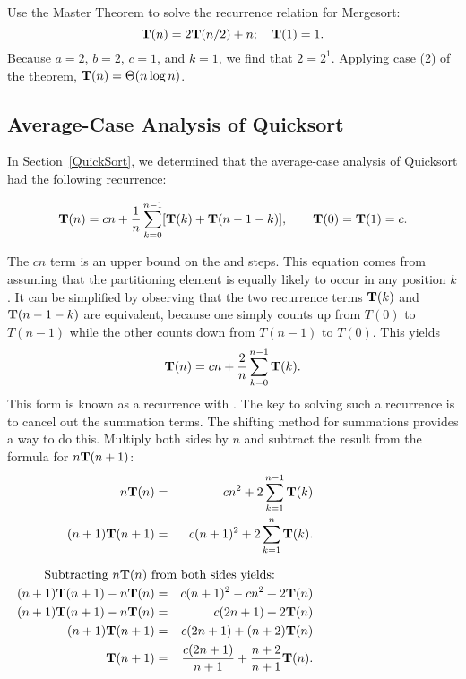\begin{example}
Use the Master Theorem to solve the recurrence relation
for Mergesort:
\[{\bf T}(n) = 2{\bf T}(n/2) + n; \quad {\bf T}(1) = 1.\]
\noindent Because $a = 2$, $b = 2$, $c = 1$, and $k = 1$, we find
that $2 = 2^1$.
Applying case (2) of the theorem, \({\bf T}(n) = \mbox{$\Theta(n \log n)$}\).
\end{example}

\subsection{Average-Case Analysis of Quicksort}
\label{QuickAnal}

In Section~\ref{QuickSort}, we determined that the average-case
analysis of Quicksort had the following recurrence:

\[{\bf T}(n) = cn + \frac{1}{n}\sum_{k=0}^{n-1} [{\bf T}(k) +
    {\bf T}(n -1 - k)], \qquad {\bf T}(0) = {\bf T}(1) = c.\]

\noindent The $cn$ term is an upper bound on the  and
 steps.
This equation comes from assuming that the partitioning element is
equally likely to occur in any position \(k\).
It can be simplified by observing that the two
recurrence terms ${\bf T}(k)$ and ${\bf T}(n - 1 - k)$ are equivalent,
because one simply counts up from $T(0)$ to $T(n-1)$ while the other
counts down from $T(n-1)$ to $T(0)$.
This yields
\[{\bf T}(n) = cn + \frac{2}{n}\sum_{k=0}^{n-1} {\bf T}(k).\]
This form is known as a recurrence with .
The key to solving such a recurrence is to cancel out the summation
terms.
The shifting method for summations provides a way to do
this.
Multiply both sides by $n$ and subtract the result from the formula
for $n{\bf T}(n+1)$:
\begin{eqnarray*}
n{\bf T}(n) & = & cn^2 + 2 \sum_{k=1}^{n-1} {\bf T}(k)\\
(n+1){\bf T}(n+1) & = & c(n+1)^2 + 2 \sum_{k=1}^{n} {\bf T}(k).\\
\noalign{\hspace{\parskip}
\hbox{\rule{0in}{1.3pc}

Subtracting $n{\bf T}(n)$ from both sides yields:}

\hspace{\parskip}}
(n+1){\bf T}(n+1) - n{\bf T}(n) & = & c(n+1)^2 - cn^2 + 2{\bf T}(n)\\
(n+1){\bf T}(n+1) - n{\bf T}(n) & = & c(2n+1) + 2{\bf T}(n)\\
(n+1){\bf T}(n+1) & = & c(2n+1) + (n+2){\bf T}(n)\\
{\bf T}(n+1) & = & \frac{c(2n+1)}{n+1} + \frac{n+2}{n+1}{\bf T}(n).
\end{eqnarray*}

